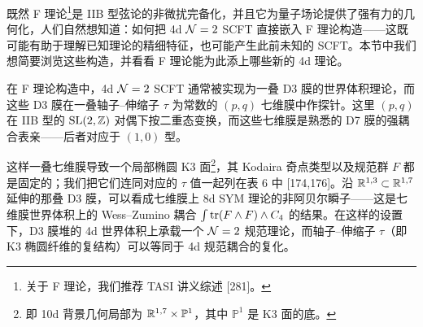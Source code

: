 
既然 F 理论\footnote{关于 F 理论，我们推荐 TASI 讲义综述 [281]。}是 IIB 型弦论的非微扰完备化，并且它为量子场论提供了强有力的几何化，人们自然想知道：如何把 4d $\mathcal{N}=2$ SCFT 直接嵌入 F 理论构造——这既可能有助于理解已知理论的精细特征，也可能产生此前未知的 SCFT。本节中我们想简要浏览这些构造，并看看 F 理论能为此添上哪些新的 4d 理论。

在 F 理论构造中，4d $\mathcal{N}=2$ SCFT 通常被实现为一叠 D3 膜的世界体积理论，而这些 D3 膜在一叠轴子--伸缩子 $\tau$ 为常数的 $(p,q)$ 七维膜中作探针。这里 $(p,q)$ 在 IIB 型的 $\mathrm{SL}(2,\mathbb{Z})$ 对偶下按二重态变换，而这些七维膜是熟悉的 D7 膜的强耦合表亲——后者对应于 $(1,0)$ 型。

这样一叠七维膜导致一个局部椭圆 K3 面\footnote{即 10d 背景几何局部为 $\mathbb{R}^{1,7}\times \mathbb{P}^1$，其中 $\mathbb{P}^1$ 是 K3 面的底。}，其 Kodaira 奇点类型以及规范群 $F$ 都是固定的；我们把它们连同对应的 $\tau$ 值一起列在表 6 中 [174,176]。沿 $\mathbb{R}^{1,3}\subset\mathbb{R}^{1,7}$ 延伸的那叠 D3 膜，可以看成七维膜上 8d SYM 理论的非阿贝尔瞬子——这是七维膜世界体积上的 Wess--Zumino 耦合 $\int \operatorname{tr}(F\wedge F)\wedge C_4$ 的结果。在这样的设置下，D3 膜堆的 4d 世界体积上承载一个 $\mathcal{N}=2$ 规范理论，而轴子--伸缩子 $\tau$（即 K3 椭圆纤维的复结构）可以等同于 4d 规范耦合的复化。

